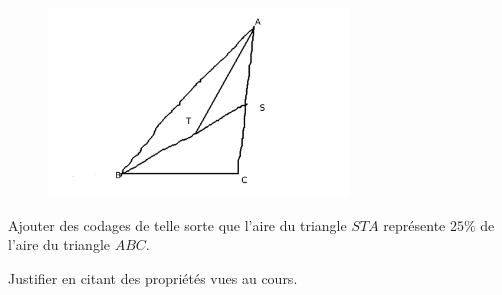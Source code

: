 
\begin{exercice}\label{exo2smath-0252}

\begin{figure}
    \vspace{-1.5cm}
        \includegraphics[width=8cm]{LBGPooLcyawW.pdf}
\end{figure}

    Ajouter des codages de telle sorte que l'aire du triangle \( STA\) représente \( 25\%\) de l'aire du triangle \( ABC\).

    Justifier en citant des propriétés vues au cours.

    \vspace{2cm}

\end{exercice}
